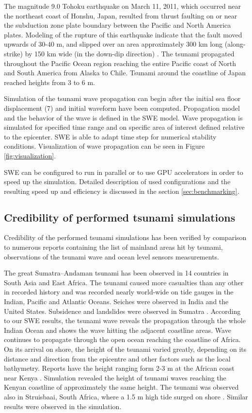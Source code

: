 \documentclass{usiinftr}
\begin{document}
The magnitude 9.0 Tohoku earthquake on March 11, 2011, which occurred near the northeast coast of Honshu, Japan,
resulted from thrust faulting on or near the subduction zone plate boundary between the Pacific and North America plates.
Modeling of the rupture of this earthquake indicate that the fault moved upwards of 30-40 m, and slipped over an area
approximately 300 km long (along-strike) by 150 km wide (in the down-dip direction) \cite{tohoku}.
The tsunami propagated throughout the Pacific Ocean region reaching the entire Pacific coast of North and South America
from Alaska to Chile. Tsunami around the coastline of Japan reached heights from 3 to 6 m.

Simulation of the tsunami wave propagation can begin after the initial sea floor displacement (7) and initial waveform have been computed.
Propagation model and the behavior  of the wave is defined in the SWE model.
Wave propagation is simulated for specified time range and on specific area of interest defined relative to the epicenter. SWE is able
to adapt time step for numerical stability conditions. Visualization of wave propagation can be seen in Figure \ref{fig:visualization}.

SWE can be configured to run in parallel or to use GPU accelerators in order to speed up the simulation. Detailed description of used configurations and the resulting speed up and efficiency is discussed in the section \ref{sec:benchmarking}.  



\subsection{Credibility of performed tsunami simulations}
Credibility of the performed tsunami simulations has been verified by comparison to numerous reports containing the
list of mainland areas hit by tsunami, observations of the tsunami wave and ocean level sensors measurements.

The great Sumatra--Andaman tsunami has been observed in 14 countries in South Asia and East Africa.
The tsunami caused more casualties than any other in recorded history and was recorded nearly world-wide
on tide gauges in the Indian, Pacific and Atlantic Oceans. Seiches were observed in India and the United States.
Subsidence and landslides were observed in Sumatra \cite{sumatra}. According to our SWE results, the tsunami wave reveals the propagation
through the whole Indian Ocean and shows the wave hitting the adjacent coastline areas. Wave continues to propagate
through the open ocean reaching the coastline of Africa. On its arrival on shore, the height of the tsunami varied greatly,
depending on its distance and direction from the epicentre and other factors such as the local bathymetry.
Reports have the height ranging form 2-3 m at the African coast near Kenya \cite{africa_tsunami}.
Simulation revealed the height of tsunami waves reaching the Kenyan coastline of approximately the same height.
The tsunami was observed also in Struisbaai, South Africa, where a 1.5 m high tide surged on shore \cite{sumatra}.
Similar results were observed in the simulation.
\end{document}
